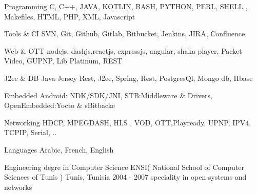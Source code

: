 \documentclass[11pt, a4paper]{awesome-cv} %
\begin{document}
\makecvheader %


\begin{cvskills}

    \cvskill
    {Programming} %
    {C, C++, JAVA, KOTLIN, BASH, PYTHON, PERL, SHELL , Makefiles, HTML, PHP, XML, Javascript  }%

    \cvskill
    {Tools \& CI} %
    {SVN, Git, Github, Gitlab, Bitbucket, Jenkins, JIRA, Confluence }%

    \cvskill
    {Web \& OTT} %
    {nodejs, dashjs,reactjs, expressjs, angular, shaka player, Packet Video, GUPNP, Lib Platinum, REST }%

    \cvskill
    {J2ee \& DB} %
    {Java Jersey Rest, J2ee, Spring, Rest, PostgresQl, Mongo db, Hbase} %

    \cvskill
    {Embedded} %
    { Android: NDK/SDK/JNI, STB:Middleware \& Drivers, OpenEmbedded:Yocto \& sBitbacke}
    
    \cvskill
    {Networking} %
    { HDCP, MPEGDASH, HLS , VOD, OTT,Playready, UPNP, IPV4, TCPIP, Serial, ..}%

    \cvskill
    {Languages} %
    {Arabic, French, English} %

\end{cvskills}


\begin{cventries}

    \cventry
    {Engineering degre in Computer Science} %
    {ENSI( National School of Computer Sciences of Tunis )} %
    {Tunis, Tunisia} %
    {2004 - 2007} %
    { %
        speciality in open systems and networks
    }

\end{cventries}
\end{document}
